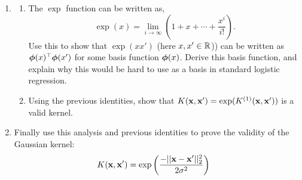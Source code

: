 \documentclass[submit]{harvardml}
\begin{document}
\begin{problem}
\begin{enumerate}
  [Hint: Use the property that for any
  $\bphi(\boldx)$,
  $K(\boldx, \boldx') = \bphi(\boldx)^\top\bphi(\boldx')$ forms a
  positive semi-definite kernel matrix. ]
  \item 
  \begin{enumerate}
  	\item The $\exp$ function can be written as,
  	$$\exp(x) = \lim_{i\rightarrow \infty} \left(1 + x + \cdots + \frac{x^i}{i!}\right).$$
  	  Use this to show that $\exp(xx')$ (here
          $x, x'\in \mathbb{R}$)) can be written as $\boldsymbol{\phi}(x)^\top \boldsymbol{\phi}(x')$ for some basis function $\boldsymbol{\phi}(x)$. Derive this basis function,
          and explain why this  would be hard to use as a basis in standard logistic regression.
  	\item Using the previous identities, show that $K(\mathbf{x}, \mathbf{x}') = \exp( K^{(1)}(\mathbf{x}, \mathbf{x}'))$ is a valid kernel.
  	

  \end{enumerate}
  \item  Finally use this analysis and previous identities to prove the validity of the Gaussian kernel:
  \begin{align*}
	K(\mathbf{x}, \mathbf{x}') &= \exp \left( \frac{-||\mathbf{x} - \mathbf{x}'||^2_2}{2\sigma^2} \right) 
  \end{align*}
  \end{enumerate}



 \end{problem}
\end{document}
